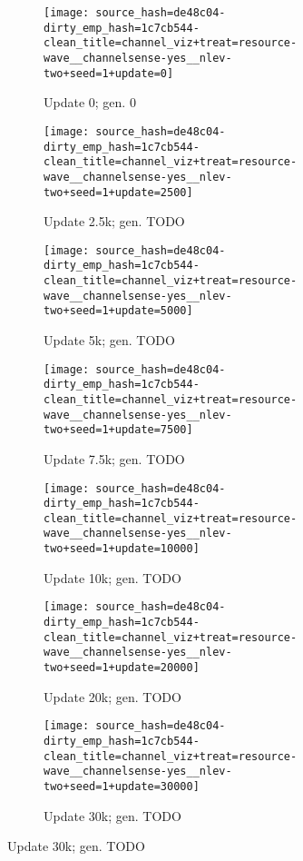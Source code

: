 \begin{figure}[!htbp]
\begin{center}
\begin{subfigure}[b]{0.49\columnwidth}
  \texttt{[image: source\_hash=de48c04-dirty\_emp\_hash=1c7cb544-clean\_title=channel\_viz+treat=resource-wave\_\_channelsense-yes\_\_nlev-two+seed=1+update=0]}
  \caption{Update 0; gen. 0}
  \label{fig:TODO}
\end{subfigure}
\begin{subfigure}[b]{0.49\columnwidth}
  \texttt{[image: source\_hash=de48c04-dirty\_emp\_hash=1c7cb544-clean\_title=channel\_viz+treat=resource-wave\_\_channelsense-yes\_\_nlev-two+seed=1+update=2500]}
  \caption{Update 2.5k; gen. TODO}
  \label{fig:TODO}
\end{subfigure}
\begin{subfigure}[b]{0.49\columnwidth}
  \texttt{[image: source\_hash=de48c04-dirty\_emp\_hash=1c7cb544-clean\_title=channel\_viz+treat=resource-wave\_\_channelsense-yes\_\_nlev-two+seed=1+update=5000]}
  \caption{Update 5k; gen. TODO}
  \label{fig:TODO}
\end{subfigure}
\begin{subfigure}[b]{0.49\columnwidth}
  \texttt{[image: source\_hash=de48c04-dirty\_emp\_hash=1c7cb544-clean\_title=channel\_viz+treat=resource-wave\_\_channelsense-yes\_\_nlev-two+seed=1+update=7500]}
  \caption{Update 7.5k; gen. TODO}
  \label{fig:TODO}
\end{subfigure}
\begin{subfigure}[b]{0.49\columnwidth}
  \texttt{[image: source\_hash=de48c04-dirty\_emp\_hash=1c7cb544-clean\_title=channel\_viz+treat=resource-wave\_\_channelsense-yes\_\_nlev-two+seed=1+update=10000]}
  \caption{Update 10k; gen. TODO}
  \label{fig:TODO}
\end{subfigure}
\begin{subfigure}[b]{0.49\columnwidth}
  \texttt{[image: source\_hash=de48c04-dirty\_emp\_hash=1c7cb544-clean\_title=channel\_viz+treat=resource-wave\_\_channelsense-yes\_\_nlev-two+seed=1+update=20000]}
  \caption{Update 20k; gen. TODO}
  \label{fig:TODO}
\end{subfigure}
\begin{subfigure}[b]{0.49\columnwidth}
  \texttt{[image: source\_hash=de48c04-dirty\_emp\_hash=1c7cb544-clean\_title=channel\_viz+treat=resource-wave\_\_channelsense-yes\_\_nlev-two+seed=1+update=30000]}
  \caption{Update 30k; gen. TODO}
  \label{fig:TODO}
\end{subfigure}

\end{center}
\end{figure}
